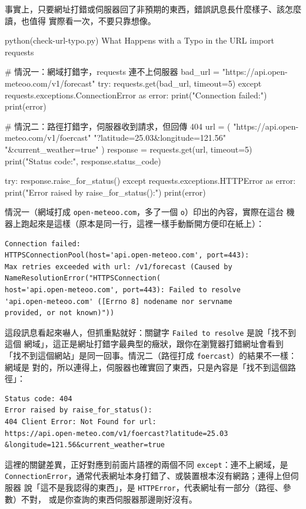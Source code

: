 事實上，只要網址打錯或伺服器回了非預期的東西，錯誤訊息長什麼樣子、該怎麼讀，也值得
實際看一次，不要只靠想像。

\begin{example}{python}{(check-url-typo.py) What Happens with a Typo in the URL}
import requests

# 情況一：網域打錯字，requests 連不上伺服器
bad_url = "https://api.open-meteoo.com/v1/forecast"
try:
    requests.get(bad_url, timeout=5)
except requests.exceptions.ConnectionError as error:
    print("Connection failed:")
    print(error)

# 情況二：路徑打錯字，伺服器收到請求，但回傳 404
url = (
    "https://api.open-meteo.com/v1/foercast"
    "?latitude=25.03&longitude=121.56"
    "&current_weather=true"
)
response = requests.get(url, timeout=5)
print("Status code:", response.status_code)

try:
    response.raise_for_status()
except requests.exceptions.HTTPError as error:
    print("Error raised by raise_for_status():")
    print(error)
\end{example}

情況一（網域打成 \texttt{open-meteoo.com}，多了一個 \texttt{o}）印出的內容，實際在這台
機器上跑起來是這樣（原本是同一行，這裡一樣手動斷開方便印在紙上）：

\begin{verbatim}
Connection failed:
HTTPSConnectionPool(host='api.open-meteoo.com', port=443):
Max retries exceeded with url: /v1/forecast (Caused by
NameResolutionError("HTTPSConnection(
host='api.open-meteoo.com', port=443): Failed to resolve
'api.open-meteoo.com' ([Errno 8] nodename nor servname
provided, or not known)"))
\end{verbatim}

這段訊息看起來嚇人，但抓重點就好：關鍵字 \texttt{Failed to resolve} 是說「找不到這個
網域」，這正是網址打錯字最典型的癥狀，跟你在瀏覽器打錯網址會看到
「找不到這個網站」是同一回事。情況二（路徑打成 \texttt{foercast}）的結果不一樣：網域是
對的，所以連得上，伺服器也確實回了東西，只是內容是「找不到這個路徑」：

\begin{verbatim}
Status code: 404
Error raised by raise_for_status():
404 Client Error: Not Found for url:
https://api.open-meteo.com/v1/foercast?latitude=25.03
&longitude=121.56&current_weather=true
\end{verbatim}

這裡的關鍵差異，正好對應到前面片語裡的兩個不同 \texttt{except}：連不上網域，是
\texttt{ConnectionError}，通常代表網址本身打錯了、或裝置根本沒有網路；連得上但伺服器
說「這不是我認得的東西」，是 \texttt{HTTPError}，代表網址有一部分（路徑、參數）不對，
或是你查詢的東西伺服器那邊剛好沒有。

